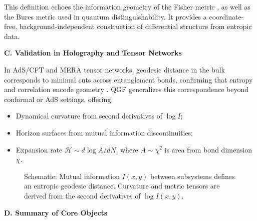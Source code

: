 \documentclass[11pt]{article}
\def\frac#1#2{#1/#2}
\begin{document}
This definition echoes the information geometry of the Fisher metric \cite{Amari2007}, as well as the Bures metric used in quantum distinguishability. It provides a coordinate-free, background-independent construction of differential structure from entropic data.

\vspace{0.5em}
\noindent\textbf{C. Validation in Holography and Tensor Networks}

In AdS/CFT and MERA tensor networks, geodesic distance in the bulk corresponds to minimal cuts across entanglement bonds, confirming that entropy and correlation encode geometry \cite{Swingle2012}. QGF generalizes this correspondence beyond conformal or AdS settings, offering:

\begin{itemize}
  \item Dynamical curvature from second derivatives of \( \log I \);
  \item Horizon surfaces from mutual information discontinuities;
  \item Expansion rate \( \mathcal{H} \sim \frac{d\log A}{dN} \), where \( A \sim \chi^2 \) is area from bond dimension \( \chi \).
\end{itemize}

\begin{figure}[H]
\centering
{}
\caption{Schematic: Mutual information \( I(x,y) \) between subsystems defines an entropic geodesic distance. Curvature and metric tensors are derived from the second derivatives of \( \log I(x,y) \).}
\label{fig:mutual-geometry}
\end{figure}

\vspace{0.5em}
\noindent\textbf{D. Summary of Core Objects}
\end{document}
